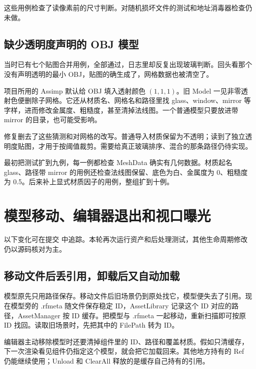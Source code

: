这些用例检查了读像素前的尺寸判断。对随机损坏文件的测试和地址消毒器检查仍未做。

\subsection{缺少透明度声明的 OBJ 模型}
当时已有七个贴图合并用例，全部通过，日志里却反复出现玻璃判断。回头看那个没有声明透明的最小 OBJ，贴图的确生成了，网格数据也被清空了。

项目所用的 Assimp 默认给 OBJ 填入透射颜色 $(1,1,1)$。旧 Model 一见非零透射色便删除子网格。它还从材质名、网格名和路径里找 glass、window、mirror 等字样，进而修改金属度、粗糙度，甚至清掉法线图。一个普通模型只要放进带 mirror 的目录，也可能受影响。

修复删去了这些猜测和对网格的改写。普通导入材质保留为不透明；读到了独立透明度贴图，才用于按阈值裁剪。需要给真正玻璃排序、混合的那条路径仍待实现。

最初把测试扩到九例，每一例都检查 MeshData 确实有几何数据。材质起名 glass、路径带 mirror 的用例还检查法线图保留、底色为白、金属度为 0、粗糙度为 0.5。后来补上显式材质因子的用例，整组扩到十例。

\newpage
\section{模型移动、编辑器退出和视口曝光}
以下变化可在提交  中追踪。本轮再次运行资产和后处理测试，其他生命周期修改仍以源码核对为主。

\subsection{移动文件后丢引用，卸载后又自动加载}
模型原先只用路径保存。移动文件后旧场景仍到原处找它，模型便失去了引用。现在模型旁的 .rfmeta 随文件保存稳定 ID，AssetLibrary 记录这个 ID 对应的路径，AssetManager 按 ID 缓存。把模型与 .rfmeta 一起移动，重新扫描即可按原 ID 找回。读取旧场景时，先把其中的 FilePath 转为 ID。

编辑器主动移除模型时还要清掉组件里的 ID、路径和覆盖材质。假如只清缓存，下一次渲染看见组件仍指定这个模型，就会把它加载回来。其他地方持有的 Ref 仍能继续使用；Unload 和 ClearAll 释放的是缓存自己持有的引用。

